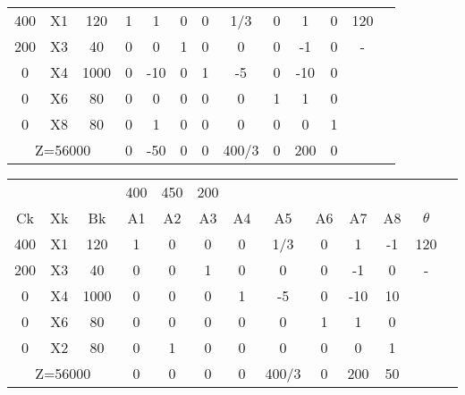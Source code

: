 \documentclass{article}
\begin{document}
\begin{enumerate}
\begin{tabular}{|c  c  c | c  c  c  c  c  c  c  c  c | c |}
			 400 & X1 & 120 & 1 & 1 & 0 & 0 & 1/3 & 0 & 1 & 0 & 120\\
			 200 & X3 & 40 & 0 & 0 & 1 & 0 & 0 & 0  & -1 & 0 & -\\
			 0 & X4 & 1000 & 0 & -10 & 0 & 1 & -5 & 0 & -10 & 0 & \\ 
			 0 & X6 & 80   & 0 & 0   & 0 & 0 & 0  & 1 & 1   & 0 & \\
			 0 & X8 & 80   & 0 & 1   & 0 & 0 & 0  & 0 & 0   & 1 & \\ \hline
			 \multicolumn{3}{|c|}{Z=56000} & 0 & -50 & 0 & 0 & 400/3 & 0 & 200 & 0 &\\ \hline
		\end{tabular}
		\begin{tabular}{|c  c  c | c  c  c  c  c  c  c  c  c | c |}
			\hline
			 \multicolumn{3}{|c|}{} & 400 & 450 & 200 & & & & & & \\ 
			 Ck  & Xk & Bk   & A1 & A2 & A3 & A4 & A5 & A6 & A7 & A8 & $\theta$\\ \hline 
			 400 & X1 & 120  & 1  & 0   & 0 & 0 & 1/3 & 0  & 1   & -1    & 120\\
			 200 & X3 & 40   & 0  & 0   & 1 & 0 & 0   & 0  & -1  & 0     & -\\
			 0   & X4 & 1000 & 0  & 0   & 0 & 1 & -5  & 0  & -10 & 10    & \\ 
			 0   & X6 & 80   & 0  & 0   & 0 & 0 & 0   & 1  & 1   & 0     & \\
			 0   & X2 & 80   & 0  & 1   & 0 & 0 & 0   & 0  & 0   & 1     & \\ \hline
			 \multicolumn{3}{|c|}{Z=56000} & 0 & 0  & 0  & 0   & 400/3 & 0 & 200 & 50 &\\ \hline
		\end{tabular}

\end{enumerate}
\end{document}
